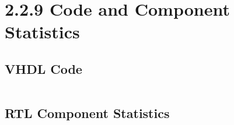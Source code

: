 \documentclass[11pt]{report}
\begin{document}
\section*{2.2.9 Code and Component Statistics}
\subsection*{VHDL Code}
\inputminted[firstline=23]{vhdl}{"../../Lab3TaskBP3/Lab3TaskBP3.srcs/sources_1/imports/sources_1/imports/Digital Engineering/Algorithm.vhd"}

\subsection*{RTL Component Statistics}
\inputminted[firstline=92, lastline=102]{text}{"../../Lab3TaskBP3/Lab3TaskBP3.runs/synth_1/algorithm.vds"}
\end{document}
